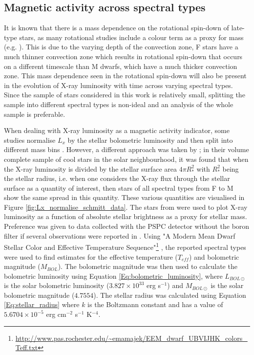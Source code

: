 \subsection{Magnetic activity across spectral types}
It is known that there is a mass dependence on the rotational spin-down of late-type stars, as many rotational studies include a colour term as a proxy for mass (e.g. \citealt{Barnes_2003,Barnes_2010,Angus_etal_2015}). This is due to the varying depth of the convection zone, F stars have a much thinner convection zone which results in rotational spin-down that occurs on a different timescale than M dwarfs, which have a much thicker convection zone. This mass dependence seen in the rotational spin-down will also be present in the evolution of X-ray luminosity with time across varying spectral types. Since the sample of stars considered in this work is relatively small, splitting the sample into different spectral types is non-ideal and an analysis of the whole sample is preferable.

When dealing with X-ray luminosity as a magnetic activity indicator, some studies normalise $L_{x}$ by the stellar bolometric luminosity and then split into different mass bins \citep{Preibisch_Feigelson_2005,Jackson_etal_2012}. However, a different approach was taken by \citet{Schmitt_Liefke_2004}; in their volume complete sample of cool stars in the solar neighbourhood, it was found that when the X-ray luminosity is divided by the stellar surface area $4\pi R_{*}^{2}$ with $R_{*}^{2}$ being the stellar radius, i.e. when one considers the X-ray flux through the stellar surface as a quantity of interest, then stars of all spectral types from F to M show the same spread in this quantity. These various quantities are visualised in Figure \ref{fig:Lx_normalise_schmitt_data}. The stars from \citet{Schmitt_Liefke_2004} were used to plot X-ray luminosity as a function of absolute stellar brightness as a proxy for stellar mass. Preference was given to data collected with the PSPC detector without the boron filter if several observations were reported in \citet{Schmitt_Liefke_2004}. Using "A Modern Mean Dwarf Stellar Color and Effective Temperature Sequence"\footnote{\url{http://www.pas.rochester.edu/~emamajek/EEM_dwarf_UBVIJHK_colors_Teff.txt}} \citep{Pecaut_Mamajek_2013}, the reported spectral types \citep{Schmitt_Liefke_2004} were used to find estimates for the effective temperature ($T_{eff}$) and bolometric magnitude ($M_{BOL}$). The bolometric magnitude was then used to calculate the bolometric luminosity using Equation \ref{Eq:bolometric_luminosity}, where $L_{BOL\odot}$ is the solar bolometric luminosity ($3.827 \times 10^{33}$ erg s$^{-1}$) and $M_{BOL\odot}$ is the solar bolometric magnitude ($4.7554$). The stellar radius was calculated using Equation \ref{Eq:stellar_radius} where $k$ is the Boltzmann constant and has a value of $5.6704 \times 10^{-5}$ erg cm$^{-2}$ s$^{-1}$ K$^{-4}$. 


